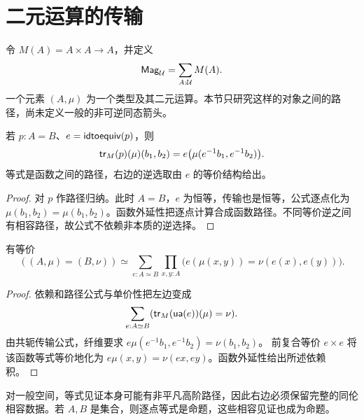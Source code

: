 \section{二元运算的传输}
\begin{definition}[二元运算结构]
令 $M(A)=A\times A\to A$，并定义
\[
\mathsf{Mag}_{\mathcal U}=\sum_{A:\mathcal U}M(A).
\]
一个元素 $(A,\mu)$ 为一个类型及其二元运算。本节只研究这样的对象之间的路径，尚未定义一般的非可逆同态箭头。
\end{definition}
\begin{lemma}[共轭传输公式]
若 $p:A=B$、$e=\mathsf{idtoequiv}(p)$，则
\[
\mathsf{tr}_M(p)(\mu)(b_1,b_2)
=e\bigl(\mu(e^{-1}b_1,e^{-1}b_2)\bigr).
\]
等式是函数之间的路径，右边的逆选取由 $e$ 的等价结构给出。
\end{lemma}
\begin{proof}
对 $p$ 作路径归纳。此时 $A=B$，$e$ 为恒等，传输也是恒等，公式逐点化为 $\mu(b_1,b_2)=\mu(b_1,b_2)$。函数外延性把逐点计算合成函数路径。不同等价逆之间有相容路径，故公式不依赖非本质的逆选择。
\end{proof}
\begin{proposition}[运算结构同一性]
有等价
\[
((A,\mu)=(B,\nu))
\simeq
\sum_{e:A\simeq B}\prod_{x,y:A}
\bigl(e(\mu(x,y))=\nu(e(x),e(y))\bigr).
\]
\end{proposition}
\begin{proof}
依赖和路径公式与单价性把左边变成
\[
\sum_{e:A\simeq B}(\mathsf{tr}_M(\mathsf{ua}(e))(\mu)=\nu).
\]
由共轭传输公式，纤维要求
$e\mu(e^{-1}b_1,e^{-1}b_2)=\nu(b_1,b_2)$。
前复合等价 $e\times e$ 将该函数等式等价地化为
$e\mu(x,y)=\nu(ex,ey)$。函数外延性给出所述依赖积。
\end{proof}
\begin{remark}
对一般空间，等式见证本身可能有非平凡高阶路径，因此右边必须保留完整的同伦相容数据。若 $A,B$ 是集合，则逐点等式是命题，这些相容见证也成为命题。
\end{remark}

